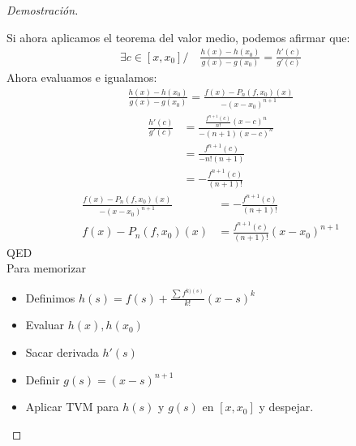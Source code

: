 \documentclass{article}
\begin{document}
\begin{proof}[Demostración]
\begin{itemize}
    \end{itemize}
    Si ahora aplicamos el teorema del valor medio, podemos afirmar que:
    \begin{equation}
        \begin{split}
            \exists c \in [x,x_{0}] / \quad \frac{h(x)-h(x_{0})}{g(x)-g(x_{0})} = \frac{h'(c)}{g'(c)}
        \end{split}
    \end{equation}
    Ahora evaluamos e igualamos:
    \begin{equation}
        \begin{split}
            \frac{h(x)-h(x_{0})}{g(x)-g(x_{0})} = \frac{f(x)- P_{n}(f,x_{0})(x)}{-(x-x_{0})^{n+1}}
        \end{split}
    \end{equation}
    \begin{equation}
        \begin{split}
            \frac{h'(c)}{g'(c)} &= \frac{\frac{f^{n+1}(c)}{n!}(x-c)^{n}}{-(n+1)(x-c)^{n}}\\
            &= \frac{f^{n+1}(c)}{-n!(n+1)} \\
            &= -\frac{f^{n+1}(c)}{(n+1)!}
        \end{split}
    \end{equation}
    \begin{equation}
        \begin{split}
            \frac{f(x)- P_{n}(f,x_{0})(x)}{-(x-x_{0})^{n+1}} &= -\frac{f^{n+1}(c)}{(n+1)!}\\
            f(x)- P_{n}(f,x_{0})(x) &= \frac{f^{n+1}(c)}{(n+1)!}(x-x_{0})^{n+1}
        \end{split}
    \end{equation}
    QED\\
Para memorizar
\begin{itemize}
	\item Definimos \(h(s) = f(s) + \frac{\sum f^{k)(s)}}{k!}(x-s)^{k}\)
	\item Evaluar \(h(x), h(x_0)\)
	\item Sacar derivada \(h'(s)\)
	\item Definir \(g(s)=(x-s)^{n+1}\)
	\item Aplicar TVM para \(h(s)\) y \(g(s)\) en \([x,x_0]\) y despejar.  
\end{itemize}
\end{proof}
\end{document}
